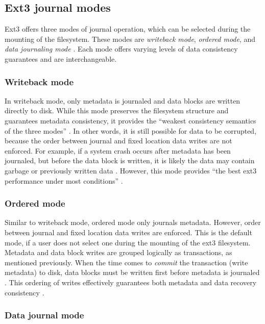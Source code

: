 \subsection{Ext3 journal modes}

Ext3 offers three modes of journal operation, which can be selected during the mounting of the filesystem. These modes are \emph{writeback mode}, \emph{ordered mode}, and \emph{data journaling mode} \citep{Prabhakaran2005a, Jones2008, Mauerer2008}. Each mode offers varying levels of data consistency guarantees and are interchangeable.

\subsubsection{Writeback mode}

In writeback mode, only metadata is journaled and data blocks are written directly to disk. While this mode preserves the filesystem structure and guarantees metadata consistency, it provides the ``weakest consistency semantics of the three modes'' \citep[p. 108]{Prabhakaran2005a}. In other words, it is still possible for data to be corrupted, because the order between journal and fixed location data writes are not enforced. For example, if a system crash occurs after metadata has been journaled, but before the data block is written, it is likely the data may contain garbage or previously written data \citep{Jones2008, Prabhakaran2005a}. However, this mode provides ``the best ext3 performance under most conditions'' \citep[p. 2]{Robbins2001b}.

\subsubsection{Ordered mode}

Similar to writeback mode, ordered mode only journals metadata. However, order between journal and fixed location data writes are enforced. This is the default mode, if a user does not select one during the mounting of the ext3 filesystem. Metadata and data block writes are grouped logically as transactions, as mentioned previously. When the time comes to \emph{commit} the transaction (write metadata) to disk, data blocks must be written first before metadata is journaled \citep{Robbins2001b}. This ordering of writes effectively guarantees both metadata and data recovery consistency \citep{Jones2008, Prabhakaran2005a}.

\subsubsection{Data journal mode}


